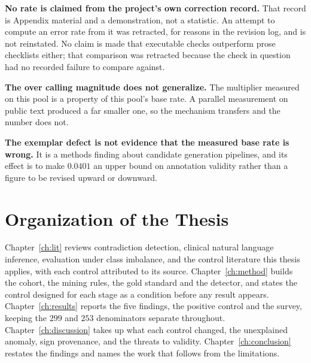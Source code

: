 \textbf{No rate is claimed from the project's own correction record.} That
record is Appendix material and a demonstration, not a statistic. An attempt to
compute an error rate from it was retracted, for reasons in the revision log,
and is not reinstated. No claim is made that executable checks outperform prose
checklists either; that comparison was retracted because the check in question
had no recorded failure to compare against.

\textbf{The over calling magnitude does not generalize.} The multiplier measured
on this pool is a property of this pool's base rate. A parallel measurement on
public text produced a far smaller one, so the mechanism transfers and the
number does not.

\textbf{The exemplar defect is not evidence that the measured base rate is
wrong.} It is a methods finding about candidate generation pipelines, and its
effect is to make $0.0401$ an upper bound on annotation validity rather than a
figure to be revised upward or downward.

\section{Organization of the Thesis}
\label{sec:intro-structure}

Chapter~\ref{ch:lit} reviews contradiction detection, clinical natural language
inference, evaluation under class imbalance, and the control literature this
thesis applies, with each control attributed to its source.
Chapter~\ref{ch:method} builds the cohort, the mining rules, the gold standard
and the detector, and states the control designed for each stage as a condition
before any result appears. Chapter~\ref{ch:results} reports the five findings,
the positive control and the survey, keeping the $299$ and $253$ denominators
separate throughout. Chapter~\ref{ch:discussion} takes up what each control
changed, the unexplained anomaly, sign provenance, and the threats to validity.
Chapter~\ref{ch:conclusion} restates the findings and names the work that
follows from the limitations.
